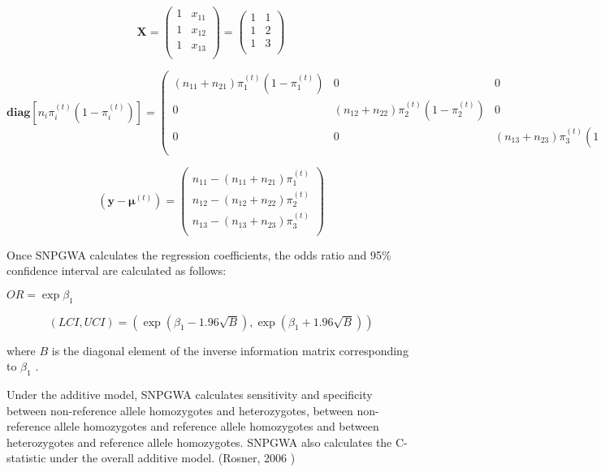 \begin{enumerate}
\begin{equation*}
  \mathbf{X} =
  \begin{pmatrix}
    1 & x_{11} \\
    1 & x_{12} \\
    1 & x_{13} \\
  \end{pmatrix}
  =
  \begin{pmatrix}
    1 & 1 \\
    1 & 2 \\
    1 & 3 \\
  \end{pmatrix}
\end{equation*}

\begin{equation*}
  \mathbf{diag}[n_i\pi_i^{(t)}(1-\pi_i^{(t)})] = 
  \begin{pmatrix}
    (n_{11}+n_{21})\pi_1^{(t)}(1-\pi_1^{(t)}) & 0 & 0 \\
    0 & (n_{12}+n_{22})\pi_2^{(t)}(1-\pi_2^{(t)}) & 0 \\
    0 & 0 & (n_{13}+n_{23})\pi_3^{(t)}(1-\pi_3^{(t)}) \\
  \end{pmatrix}
\end{equation*}

\begin{equation*}
  (\mathbf{y}-\boldsymbol{\mu}^{(t)}) = 
  \begin{pmatrix}
    n_{11} - (n_{11} + n_{21})\pi_1^{(t)} \\
    n_{12} - (n_{12} + n_{22})\pi_2^{(t)} \\
    n_{13} - (n_{13} + n_{23})\pi_3^{(t)} \\
  \end{pmatrix}
\end{equation*}

Once SNPGWA calculates the regression coefficients, the odds ratio and 95\%
confidence interval are calculated as follows:

\noindent{}$OR = \exp{\beta_1}$

\begin{equation*}
  (LCI, UCI) = \left(\exp\left(\beta_1 - 1.96\sqrt{B}\right), \exp\left(\beta_1 + 1.96\sqrt{B}\right)\right)
\end{equation*}

where $B$ is the diagonal element of the inverse information matrix
corresponding to $\beta_1$ .

Under the additive model, SNPGWA calculates sensitivity and specificity between
non-reference allele homozygotes and heterozygotes, between non-reference allele
homozygotes and reference allele homozygotes and between heterozygotes and
reference allele homozygotes.  SNPGWA also calculates the C-statistic under the
overall additive model. (Rosner, 2006 \cite{Rosner06})


\end{enumerate}
